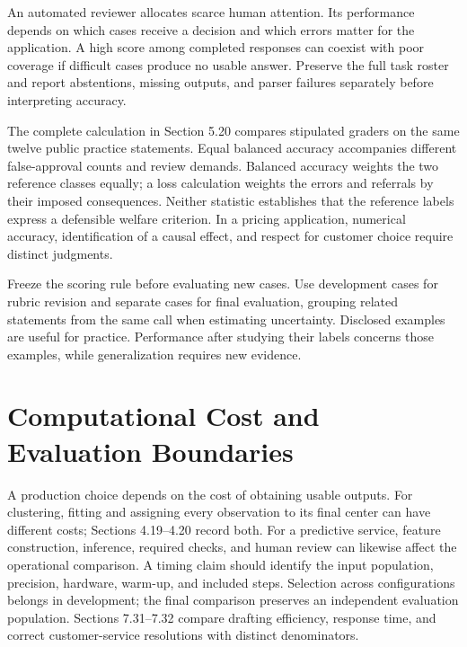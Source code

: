 \noindent \noindent An automated reviewer allocates scarce human attention. Its
performance depends on which cases receive a decision and which errors
matter for the application. A high score among completed responses can
coexist with poor coverage if difficult cases produce no usable answer.
Preserve the full task roster and report abstentions, missing outputs,
and parser failures separately before interpreting accuracy.

The complete calculation in Section 5.20 compares stipulated graders on
the same twelve public practice statements. Equal balanced accuracy
accompanies different false-approval counts and review demands. Balanced
accuracy weights the two reference classes equally; a loss calculation
weights the errors and referrals by their imposed consequences. Neither
statistic establishes that the reference labels express a defensible
welfare criterion. In a pricing application, numerical accuracy,
identification of a causal effect, and respect for customer choice
require distinct judgments.

Freeze the scoring rule before evaluating new cases. Use development
cases for rubric revision and separate cases for final evaluation,
grouping related statements from the same call when estimating
uncertainty. Disclosed examples are useful for practice. Performance
after studying their labels concerns those examples, while
generalization requires new evidence.

\hypertarget{M07-computational-cost-and-evaluation-boundaries}{%
\section{Computational Cost and Evaluation
Boundaries}\label{M07-computational-cost-and-evaluation-boundaries}}

\noindent \noindent A production choice depends on the cost of obtaining usable
outputs. For clustering, fitting and assigning every observation to its
final center can have different costs; Sections 4.19--4.20 record both.
For a predictive service, feature construction, inference, required
checks, and human review can likewise affect the operational comparison.
A timing claim should identify the input population, precision,
hardware, warm-up, and included steps. Selection across configurations
belongs in development; the final comparison preserves an independent
evaluation population. Sections 7.31--7.32 compare drafting efficiency,
response time, and correct customer-service resolutions with distinct
denominators.

